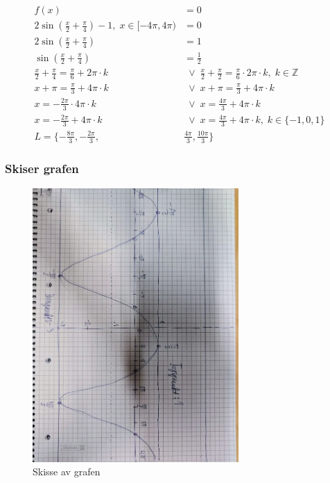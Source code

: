 \documentclass{article}
\begin{document}
\begin{align*}
    f(x) &= 0 \\
    2\sin(\frac{x}{2}+\frac{\pi}{4})-1, \; x \in [-4\pi, 4\pi) &= 0 \\
    2\sin(\frac{x}{2}+\frac{\pi}{4}) &= 1 \\
    \sin(\frac{x}{2}+\frac{\pi}{4}) &= \frac{1}{2} \\
    \frac{x}{2} + \frac{\pi}{4} = \frac{\pi}{6} + 2\pi \cdot k  &\;\lor\; \frac{x}{2} + \frac{\pi}{2} = \frac{\pi}{6} \cdot 2\pi \cdot k, \; k\in\mathbb{Z} \\
    x+\pi=\frac{\pi}{3} + 4\pi \cdot k &\;\lor\; x + \pi = \frac{\pi}{3} + 4\pi \cdot k \\
    x=-\frac{2\pi}{3} \cdot 4\pi \cdot k &\; \lor \; x=\frac{4\pi}{3} + 4\pi \cdot k \\
    x=-\frac{2\pi}{3} + 4\pi \cdot k &\; \lor \; x=\frac{4\pi}{3} + 4\pi \cdot k, \; k \in \{ -1, 0, 1\} \\
    L= \{-\frac{8\pi}{3}, -\frac{2\pi}{3}, & \frac{4\pi}{3}, \frac{10\pi}{3} \}
\end{align*}

\subsubsection{Skiser grafen}

\begin{figure}[h]
    \centering
    \includegraphics[width=0.7\textwidth, angle=90]{tegning.png}
    \caption{Skisse av grafen}
\end{figure}
\end{document}
